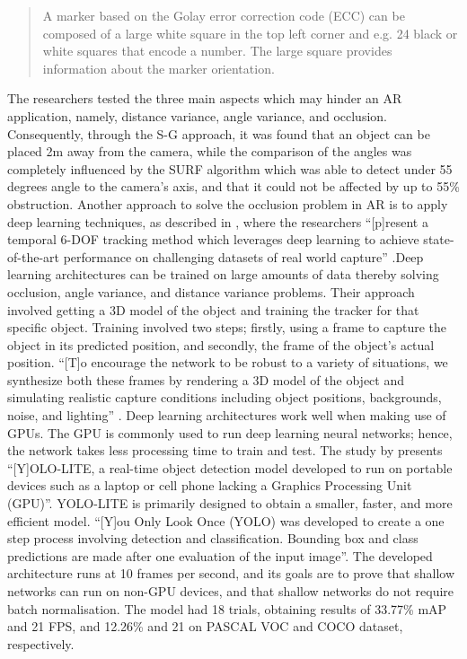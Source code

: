 \documentclass{aifyp}
\begin{document}
\begin{quote}
    A marker based on the Golay error correction code (ECC) can be composed of a large white square in the top left corner and e.g. 24 black or white squares that encode a number. The large square provides information about the marker orientation. \cite{HybridSURFAR}
\end{quote}
\indent The researchers tested the three main aspects which may hinder an AR application, namely, distance variance, angle variance, and occlusion. Consequently, through the S-G approach, it was found that an object can be placed 2m away from the camera, while the comparison of the angles was completely influenced by the SURF algorithm which was able to detect under 55 degrees angle to the camera’s axis, and that it could not be affected by up to 55\% obstruction.
\newline
\newline
\indent Another approach to solve the occlusion problem in AR is to apply deep learning techniques, as described in \cite{DEEPDOFTracking}, where the researchers “[p]resent a temporal 6-DOF tracking method which leverages deep learning to achieve state-of-the-art performance on challenging datasets of real world capture” \cite{DEEPDOFTracking}.Deep learning architectures can be trained on large amounts of data thereby solving occlusion, angle variance, and distance variance problems. Their approach involved getting a 3D model of the object and training the tracker for that specific object. Training involved two steps; firstly, using a frame to capture the object in its predicted position, and secondly, the frame of the object’s actual position. “[T]o encourage the network to be robust to a variety of situations, we synthesize both these frames by rendering a 3D model of the object and simulating realistic capture conditions including object positions, backgrounds, noise, and lighting” \cite{DEEPDOFTracking}.
\newline
\newline
\indent Deep learning architectures work well when making use of GPUs. The GPU is commonly used to run deep learning neural networks; hence, the network takes less processing time to train and test. The study by \cite{YOLOLITE} presents “[Y]OLO-LITE, a real-time object detection model developed to run on portable devices such as a laptop or cell phone lacking a Graphics Processing Unit (GPU)”. YOLO-LITE is primarily designed to obtain a smaller, faster, and more efficient model. “[Y]ou Only Look Once (YOLO) was developed to create a one step process involving detection and classification. Bounding box and class predictions are made after one evaluation of the input image”\cite{YOLOLITE}. The developed architecture runs at 10 frames per second, and its goals are to prove that shallow networks can run on non-GPU devices, and that shallow networks do not require batch normalisation. The model had 18 trials, obtaining results of 33.77\% mAP and 21 FPS, and 12.26\% and 21 on PASCAL VOC and COCO dataset, respectively. 
\end{document}
